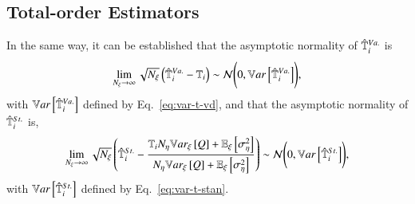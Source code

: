 \subsection{Total-order Estimators}
In the same way, it can be established that the asymptotic normality of $\hat{\mathbb{T}}_{i}^{Va.}$ is
\begin{equation}
    \lim_{{N_\xi} \rightarrow \infty} \sqrt{{N_\xi}} \left( \hat{\mathbb{T}}_{i}^{Va.} - \mathbb{T}_{i} \right) \sim \mathcal{N} \Biggl( 0, \mathbb{V}ar\left[\hat{\mathbb{T}}_{i}^{Va.}\right] \Biggr) ,
\end{equation}
with $\mathbb{V}ar\left[\hat{\mathbb{T}}_{i}^{Va.}\right]$ defined by Eq.~\eqref{eq:var-t-vd},
and that the asymptotic normality of $\hat{\mathbb{T}}_{i}^{St.}$ is,
\begin{equation}
    \lim_{{N_\xi} \rightarrow \infty} \sqrt{{N_\xi}} \left( \hat{\mathbb{T}}_{i}^{St.} - \frac{\mathbb{T}_{i} {N_\eta} \mathbb{V}ar_{\xi}\left[Q\right] + \mathbb{E}_\xi\left[\sigma^2_\eta\right]}{{N_\eta}\mathbb{V}ar_{\xi}\left[Q\right] + \mathbb{E}_\xi\left[\sigma^2_\eta\right]} \right) \sim \mathcal{N} \Biggl( 0, \mathbb{V}ar\left[\hat{\mathbb{T}}_{i}^{St.}\right] \Biggr) ,
\end{equation}
with $\mathbb{V}ar\left[\hat{\mathbb{T}}_{i}^{St.}\right]$ defined by Eq.~\eqref{eq:var-t-stan}.

